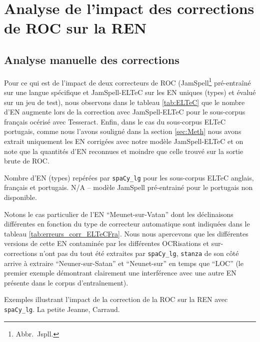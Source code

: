 \section{Analyse de l'impact des corrections de ROC sur la REN}
\label{subsec:COR-OCR-IMPACT-NER}
\subsection{Analyse manuelle des corrections }
Pour ce qui est de l'impact de deux correcteurs de ROC (JamSpell\footnote{Abbr.\ Jspll.} pré-entraîné sur une langue spécifique et JamSpell-ELTeC  sur les EN uniques (types) et évalué sur un jeu de test), nous observons dans le tableau \ref{tab:ELTeC} que le nombre d'EN augmente lors de la correction avec JamSpell-ELTeC pour le sous-corpus français océrisé avec Tesseract. 
Enfin, dans le cas du sous-corpus ELTeC portugais, comme nous l'avons souligné dans la section \ref{sec:Meth} nous avons extrait uniquement les EN corrigées avec notre modèle JamSpell-ELTeC et on note que la quantités d'EN reconnues et moindre que celle trouvé sur la sortie brute de ROC.
\begin{table}[h!]
    \centering
    \small
    
    \caption{Nombre d'EN (types) repérées par \texttt{spaCy\_lg} pour les sous-corpus ELTeC anglais, français et portugais. N/A -- modèle JamSpell pré-entrainé pour le portugais non disponible.}
    \label{tab:ELTeC}
\end{table}

Notons le cas particulier de l'EN ``Meunet-sur-Vatan'' dont les déclinaisons différentes en fonction du type de correcteur automatique sont indiquées dans le tableau \ref{tab:erreurs_corr_ELTeCFra}. Nous nous apercevons que les différentes versions de cette EN contaminée par les différentes OCRisations et sur-corrections n'ont pas du tout été extraites par \texttt{spaCy\_lg}, \texttt{stanza} de son côté arrive à extraire ``Neuner-sur-Satan'' et ``Neunet-sur'' en temps que ``LOC'' (le premier exemple démontrant clairement une interférence avec une autre EN présente dans le corpus d'entraînement).

\begin{table}[h!]
    \small
    \centering
   
     \caption{Exemples illustrant l'impact de la correction de la ROC sur la REN avec \texttt{spaCy\_lg}. {\normalfont La petite Jeanne}, Carraud.}
    \label{tab:erreurs_corr_ELTeCFra}
\end{table}

